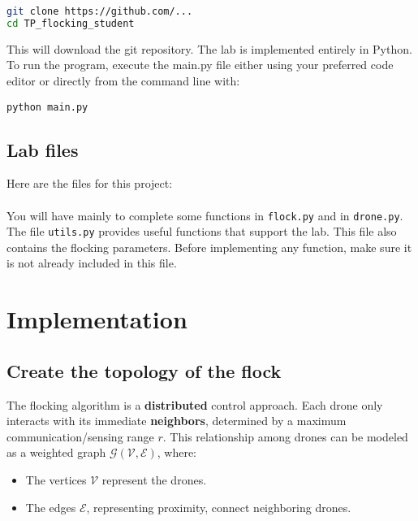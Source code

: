 \documentclass{article}
\begin{document}
\begin{lstlisting}[language=bash, frame=single]
git clone https://github.com/...
cd TP_flocking_student
\end{lstlisting}

This will download the git repository. The lab is implemented entirely in Python. To run the program, execute the main.py file either using your preferred code editor or directly from the command line with:

\begin{lstlisting}[frame=single]
python main.py
\end{lstlisting}

\subsection{Lab files}


Here are the files for this project:

\begin{minipage}{.4\linewidth}
\end{minipage}
\paragraph{}
You will have mainly to complete some functions in \texttt{flock.py} and in \texttt{drone.py}. The file \texttt{utils.py} provides useful functions that support the lab. This file also contains the flocking parameters. Before implementing any function, make sure it is not already included in this file. 

\section{Implementation}

\subsection{Create the topology of the flock}
The flocking algorithm is a \textbf{distributed} control approach. Each drone only interacts with its immediate \textbf{neighbors}, determined by a maximum communication/sensing range $r$. This relationship among drones can be modeled as a weighted graph $\mathcal{G}(\mathcal{V}, \mathcal{E})$, where:
\begin{itemize}
 \item The vertices $\mathcal{V}$ represent the drones.
 \item The edges $\mathcal{E}$, representing proximity, connect neighboring drones.
\end{itemize}
\end{document}
